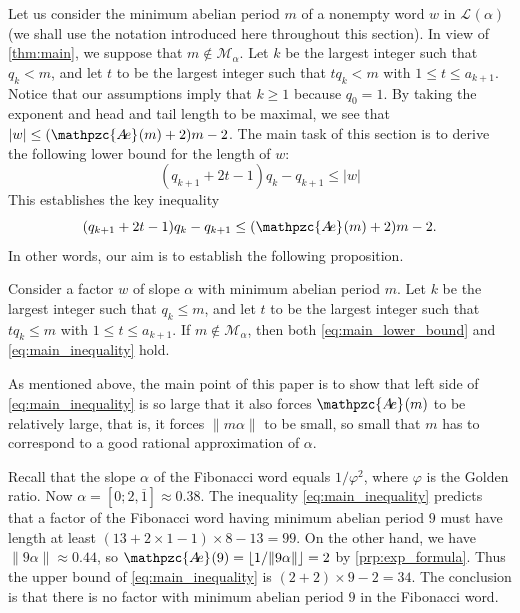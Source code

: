 \documentclass[a4paper,fleqn]{article}
\providecommand{\abs}[1]{\lvert#1\rvert}
\providecommand{\norm}[1]{\lVert#1\rVert}
\providecommand{\floor}[1]{\lfloor#1\rfloor}
\newcommand{\Lang}[2][]{\mathcal{L}_{#1}(#2)}
\newcommand{\abexp}[2][]{\mathpzc{A\mkern-3mu e}_{#1}(#2)}
\begin{document}
  Let us consider the minimum abelian period $m$ of a nonempty word $w$ in $\Lang{\alpha}$ (we shall use the notation
  introduced here throughout this section). In view of \autoref{thm:main}, we suppose that $m \notin
  \mathcal{M}_\alpha$. Let $k$ be the largest integer such that $q_k < m$, and let $t$ to be the largest integer such
  that $tq_k < m$ with $1 \leq t \leq a_{k+1}$. Notice that our assumptions imply that $k \geq 1$ because $q_0 = 1$. By
  taking the exponent and head and tail length to be maximal, we see that $\abs{w} \leq (\abexp{m} + 2)m - 2$. The main
  task of this section is to derive the following lower bound for the length of $w$:
  \begin{equation}\label{eq:main_lower_bound}
    (q_{k+1} + 2t - 1)q_k - q_{k+1} \leq \abs{w}
  \end{equation}
  This establishes the key inequality
  \begin{equation}\label{eq:main_inequality}
    (q_{k+1} + 2t - 1)q_k - q_{k+1} \leq (\abexp{m} + 2)m - 2.
  \end{equation}
  In other words, our aim is to establish the following proposition.
  
  \begin{proposition}\label{prp:main_inequality}
    Consider a factor $w$ of slope $\alpha$ with minimum abelian period $m$. Let $k$ be the largest integer such that
    $q_k \leq m$, and let $t$ to be the largest integer such that $tq_k \leq m$ with $1 \leq t \leq a_{k+1}$. If
    $m \notin \mathcal{M}_\alpha$, then both \eqref{eq:main_lower_bound} and \eqref{eq:main_inequality} hold.
  \end{proposition}

  As mentioned above, the main point of this paper is to show that left side of \eqref{eq:main_inequality} is so large
  that it also forces $\abexp{m}$ to be relatively large, that is, it forces $\norm{m\alpha}$ to be small, so small
  that $m$ has to correspond to a good rational approximation of $\alpha$.

  \begin{example}
    Recall that the slope $\alpha$ of the Fibonacci word equals $1/\varphi^2$, where $\varphi$ is the Golden ratio.
    Now $\alpha = [0; 2, \overline{1}] \approx 0.38$. The inequality \eqref{eq:main_inequality} predicts that a factor
    of the Fibonacci word having minimum abelian period $9$ must have length at least
    $(13 + 2 \times 1 - 1) \times 8 - 13 = 99$. On the other hand, we have $\norm{9\alpha} \approx 0.44$, so
    $\abexp{9} = \floor{1/\norm{9\alpha}} = 2$ by \autoref{prp:exp_formula}. Thus the upper bound of
    \eqref{eq:main_inequality} is $(2 + 2) \times 9 - 2 = 34$. The conclusion is that there is no factor with minimum
    abelian period $9$ in the Fibonacci word.
  \end{example}
  
\end{document}

